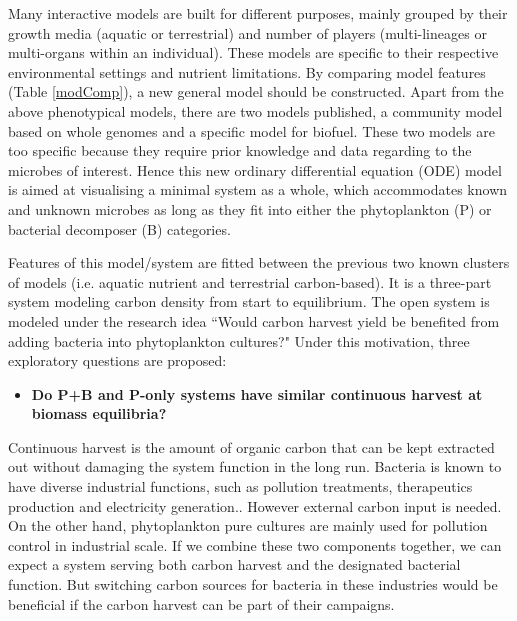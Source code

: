\documentclass[../thesis.tex]{subfiles} %
\begin{document}
Many interactive models are built for different purposes, mainly grouped by their growth media (aquatic or terrestrial) and number of players (multi-lineages or multi-organs within an individual).  These models are specific to their respective environmental settings and nutrient limitations.  By comparing model features (Table \ref{modComp}), a new general model should be constructed.  Apart from the above phenotypical models, there are two models published, a community model based on whole genomes\autocite{harcombe2014metabolic} and a specific model for biofuel\autocite{kirthiga2014mathematical}.  These two models are too specific because they require prior knowledge and data regarding to the microbes of interest.  Hence this new ordinary differential equation (ODE) model is aimed at visualising a minimal system as a whole, which accommodates known and unknown microbes as long as they fit into either the phytoplankton (P) or bacterial decomposer (B) categories.

Features of this model/system are fitted between the previous two known clusters of models (i.e. aquatic nutrient and terrestrial carbon-based).  It is a three-part system modeling carbon density from start to equilibrium.  The open system is modeled under the research idea ``Would carbon harvest yield be benefited from adding bacteria into phytoplankton cultures?"  Under this motivation, three exploratory questions are proposed:

\begin{itemize}
    \item \textbf{
    Do P+B and P-only systems have similar continuous harvest at biomass equilibria?
    }
\end{itemize}

Continuous harvest is the amount of organic carbon that can be kept extracted out without damaging the system function in the long run.  Bacteria is known to have diverse industrial functions, such as pollution treatments\autocite{dash2013marine,naik2013lead}, therapeutics production\autocite{huang2012industrial} and electricity generation.\autocite{songera2012electricity}.  However external carbon input is needed.  On the other hand, phytoplankton pure cultures are mainly used for pollution control\autocite{evanson_2019} in industrial scale.  If we combine these two components together, we can expect a system serving both carbon harvest and the designated bacterial function.  But switching carbon sources for bacteria in these industries would be beneficial if the carbon harvest can be part of their campaigns.
\end{document}

